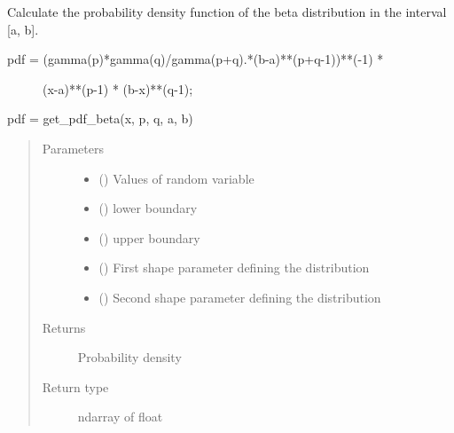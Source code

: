 \documentclass[letterpaper,10pt,english,openany,oneside]{sphinxmanual}
\begin{document}

\begin{fulllineitems}
\label{\detokenize{pygpc:pygpc.misc.get_pdf_beta}}
Calculate the probability density function of the beta distribution in the interval {[}a, b{]}.
\begin{description}
\item[{pdf = (gamma(p)*gamma(q)/gamma(p+q).*(b-a)**(p+q-1))**(-1) *}] \leavevmode
(x-a)**(p-1) * (b-x)**(q-1);

\end{description}

pdf = get\_pdf\_beta(x, p, q, a, b)
\begin{quote}\begin{description}
\item[{Parameters}] \leavevmode\begin{itemize}
\item {} 
 () \textendash{} Values of random variable

\item {} 
 () \textendash{} lower boundary

\item {} 
 () \textendash{} upper boundary

\item {} 
 () \textendash{} First shape parameter defining the distribution

\item {} 
 () \textendash{} Second shape parameter defining the distribution

\end{itemize}

\item[{Returns}] \leavevmode
{} \textendash{} Probability density

\item[{Return type}] \leavevmode
ndarray of float

\end{description}\end{quote}

\end{fulllineitems}
\end{document}
